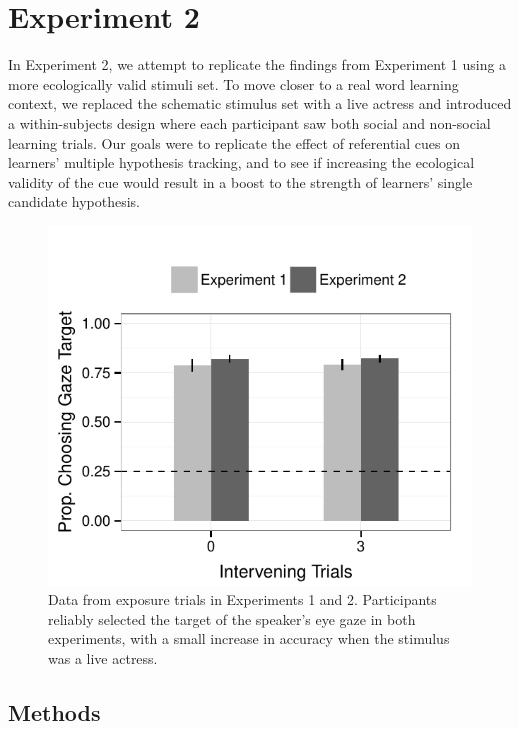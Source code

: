 \documentclass[10pt,letterpaper]{article}
\begin{document}
\section{Experiment 2}

In Experiment 2, we attempt to replicate the findings from Experiment 1 using a more ecologically valid stimuli set. To move closer to a real word learning context, we replaced the schematic stimulus set with a live actress and introduced a within-subjects design where each participant saw both social and non-social learning trials. Our goals were to replicate the effect of referential cues on learners' multiple hypothesis tracking, and to see if increasing the ecological validity of the cue would result in a boost to the strength of learners' single candidate hypothesis.  

\begin{figure}[t!]
\begin{center}
\includegraphics[scale=0.4]{plots_figs/acc-expo-expt1_2}
\end{center}
\caption{Data from exposure trials in Experiments 1 and 2. Participants reliably selected the target of the speaker's eye gaze in both experiments, with a small increase in accuracy when the stimulus was a live actress.}
\end{figure}

\subsection{Methods}
\end{document}
